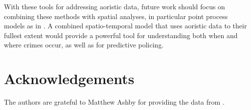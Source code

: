 With these tools for addressing aoristic data, future work should focus on combining these methods with spatial analyses, in particular point process models as in \citet{wang2014modeling}. A combined spatio-temporal model that uses aoristic data to their fullest extent would provide a powerful tool for understanding both when and where crimes occur, as well as for predictive policing.

\section{Acknowledgements}


The authors are grateful to Matthew Ashby for providing the data from \citet{ashby2013comparison}.




\newpage


